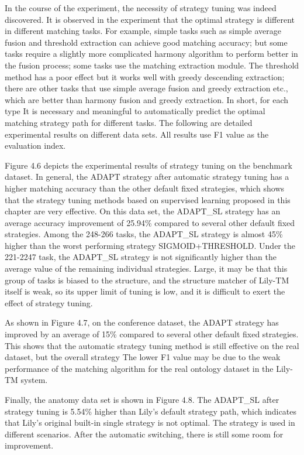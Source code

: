 \documentclass[twoside]{article}
\begin{document}
In the course of the experiment, the necessity of strategy tuning was indeed discovered.
It is observed in the experiment that the optimal strategy is different in different matching tasks.
For example, simple tasks such as simple average fusion and threshold extraction can achieve good matching accuracy; but some tasks require a slightly more complicated harmony algorithm to perform better in the fusion process; some tasks use the matching extraction module. The threshold method has a poor effect but it works well with greedy descending extraction; there are other tasks that use simple average fusion and greedy extraction etc., which are better than harmony fusion and greedy extraction.
In short, for each type It is necessary and meaningful to automatically predict the optimal matching strategy path for different tasks.
The following are detailed experimental results on different data sets. All results use F1 value as the evaluation index.

Figure 4.6 depicts the experimental results of strategy tuning on the benchmark dataset.
In general, the ADAPT strategy after automatic strategy tuning has a higher matching accuracy than the other default fixed strategies, which shows that the strategy tuning methods based on supervised learning proposed in this chapter are very effective.
On this data set, the ADAPT\_SL strategy has an average accuracy improvement of 25.94\% compared to several other default fixed strategies.
Among the 248-266 tasks, the ADAPT\_SL strategy is almost 45\% higher than the worst performing strategy SIGMOID+THRESHOLD.
Under the 221-2247 task, the ADAPT\_SL strategy is not significantly higher than the average value of the remaining individual strategies. Large, it may be that this group of tasks is biased to the structure, and the structure matcher of Lily-TM itself is weak, so its upper limit of tuning is low, and it is difficult to exert the effect of strategy tuning.

As shown in Figure 4.7, on the conference dataset, the ADAPT strategy has improved by an average of 15\% compared to several other default fixed strategies. This shows that the automatic strategy tuning method is still effective on the real dataset, but the overall strategy The lower F1 value may be due to the weak performance of the matching algorithm for the real ontology dataset in the Lily-TM system.

Finally, the anatomy data set is shown in Figure 4.8. The ADAPT\_SL after strategy tuning is 5.54\% higher than Lily's default strategy path, which indicates that Lily's original built-in single strategy is not optimal. The strategy is used in different scenarios. After the automatic switching, there is still some room for improvement.
\end{document}
